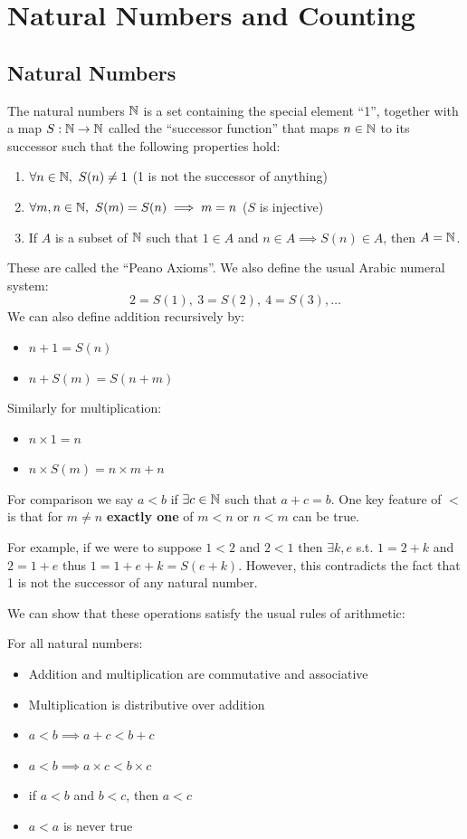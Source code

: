 \documentclass[../main.tex]{subfiles}
\begin{document}
\chapter{Natural Numbers and Counting}
\section{Natural Numbers}
\begin{definition}
  The natural numbers $\mathbb{N}$ is a set containing the special element ``1'', together with a map $S: \mathbb{N} \to \mathbb{N}$ called the ``successor function'' that maps $n \in \mathbb{N}$ to its successor such that the following properties hold:
  \begin{enumerate}
    \item $\forall n \in \mathbb{N},\ S(n) \neq 1$ (1 is not the successor of anything)
    \item $\forall m, n \in \mathbb{N},\ S(m) = S(n) \implies m = n$ ($S$ is injective)
    \item If $A$ is a subset of $\mathbb{N}$ such that $1 \in A$ and $n \in A \implies S(n) \in A$, then $A = \mathbb{N}$.
  \end{enumerate}
  \label{naturalDef}
\end{definition}
These are called the ``Peano Axioms''.
We also define the usual Arabic numeral system:
\[
  2 = S(1),\ 3 = S(2),\ 4 = S(3), \ldots
\]
We can also define addition recursively by:
\begin{itemize}
  \item $n + 1 = S(n)$
  \item $n + S(m) = S(n + m)$
\end{itemize}
Similarly for multiplication:
\begin{itemize}
  \item $n \times 1 = n$
  \item $n \times S(m) = n \times m + n$
\end{itemize}
For comparison we say $a < b$ if $\exists c \in \mathbb{N}$ such that $a + c = b$.
One key feature of $<$ is that for $m \neq n$ \textbf{exactly one} of $m < n$ or $n < m$ can be true.
\begin{example}
  For example, if we were to suppose $1 < 2$ and $2 < 1$ then  $\exists k, e$ s.t. $1 = 2 + k$ and $2 = 1 + e$ thus $1 = 1 + e + k = S(e + k)$.
  However, this contradicts the fact that 1 is not the successor of any natural number.
\end{example}
We can show that these operations satisfy the usual rules of arithmetic:
\begin{proposition}
For all natural numbers:
  \begin{itemize}
    \item Addition and multiplication are commutative and associative
    \item Multiplication is distributive over addition
    \item $a < b \implies a + c < b + c$
    \item $a < b \implies a \times c < b \times c$
    \item if $a < b$ and $b < c$, then $a < c$
    \item $a < a$ is never true
  \end{itemize}
\end{proposition}
\end{document}
